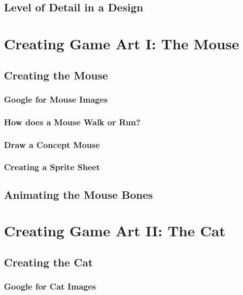 \documentclass[12pt]{amsbook}
\theoremstyle{definition}
\theoremstyle{remark}
\numberwithin{figure}{chapter}
\numberwithin{table}{chapter}
\numberwithin{section}{chapter}
\numberwithin{equation}{section}
\begin{document}
\section{Level of Detail in a Design}
\cite{GHJV95}


\chapter{Creating Game Art I: The Mouse}

\section{Creating the Mouse}

\subsection{Google for Mouse Images}

\subsection{How does a Mouse Walk or Run?}

\subsection{Draw a Concept Mouse}

\subsection{Creating a Sprite Sheet}

\section{Animating the Mouse Bones}

\chapter{Creating Game Art II: The Cat}

\section{Creating the Cat}

\subsection{Google for Cat Images}
\end{document}
